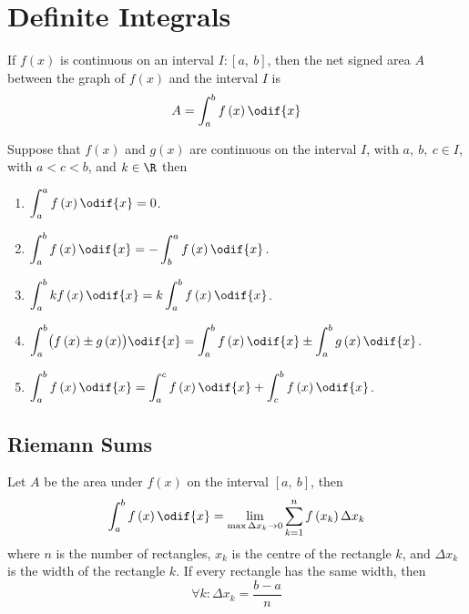 \documentclass{article}
\begin{document}
\section{Definite Integrals}
\begin{theorem}
    If \(f\left( x \right)\) is continuous on an interval \(I:\left[ a,\:b \right]\),
    then the net signed area \(A\) between the graph of \(f\left( x \right)\) and the
    interval \(I\) is
    \begin{equation*}
        A = \int_a^b f\left( x \right) \odif{x}
    \end{equation*}
\end{theorem}
\begin{tcolorboxlarge}[title={Properties of Definite Integrals}]
    \begin{theorem}
        Suppose that \(f\left( x \right)\) and \(g\left( x \right)\) are continuous on the
        interval \(I\), with \(a,\:b,\:c\in I\), with \(a < c < b\), and
        \(k\in\R\) then
        \begin{enumerate}[label=\normalfont\alph*)] %
            \item \(\displaystyle\int_a^a f\left( x \right) \odif{x} = 0\).
            \item \(\displaystyle\int_a^b f\left( x \right) \odif{x} = -\int_b^a f\left( x \right) \odif{x}\).
            \item \(\displaystyle\int_a^b kf\left( x \right) \odif{x} = k\int_a^b f\left( x \right) \odif{x}\).
            \item \(\displaystyle\int_a^b \bigl(f\left( x \right) \pm g\left( x \right)\bigr) \odif{x} = \int_a^b f\left( x \right) \odif{x} \pm \int_a^b g\left( x \right) \odif{x}\).
            \item \(\displaystyle\int_a^b f\left( x \right) \odif{x} = \int_a^c f\left( x \right) \odif{x} + \int_c^b f\left( x \right) \odif{x}\).
        \end{enumerate}
    \end{theorem}
\end{tcolorboxlarge}
\subsection{Riemann Sums}
\begin{theorem}
    \label{theorem:1d_riemann_sums}
    Let \(A\) be the area under \(f\left( x \right)\) on the interval
    \(\left[ a,\:b \right]\), then
    \begin{equation*}
        \int_a^b f\left( x \right) \odif{x} = \lim_{\max{\Delta x_k}\to 0} \sum_{k=1}^n f\left( x_k \right) \Delta x_k
    \end{equation*}
    where \(n\) is the number of rectangles, \(x_k\) is the centre of
    the rectangle \(k\), and \(\Delta x_k\) is the width of the
    rectangle \(k\). If every rectangle has the same width, then
    \begin{equation*}
        \forall k:\Delta x_k = \frac{b-a}{n}
    \end{equation*}
\end{theorem}
\end{document}
